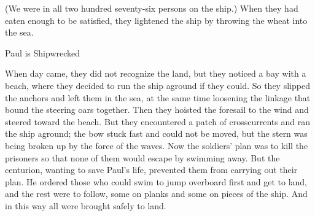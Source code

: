 {(We were
in all
two hundred seventy-six
persons
on
the ship.)
When they had eaten enough to be satisfied,
they lightened
the ship
by throwing
the wheat
into
the sea.
\par }{\SH Paul is Shipwrecked
\par }{\PP {}When
day
came,
they did not
recognize
the land,
but
they noticed
a bay
with a beach,
where
they decided
to run
the ship
aground
if
they could.
So
they slipped
the anchors
and left
them in
the sea,
at the same time
loosening
the linkage
that bound the steering oars
together. Then
they hoisted
the foresail
to the wind
and steered
toward
the beach.
But
they encountered
a patch
of crosscurrents
and
ran
the ship
aground;
the bow
stuck fast
and could not be moved,
but
the stern
was being broken up
by
the force of the waves.
Now
the soldiers’
plan
was to kill
the prisoners
so that
none
of them
would escape by swimming away.
But
the centurion,
wanting
to save
Paul’s
life, prevented
them
from carrying out their plan.
He ordered
those who could
swim
to jump overboard
first
and get
to
land,
and
the rest
were to follow, some on
planks
and
some
on
pieces of
the ship.
And
in this way
all
were
brought safely
to
land.

}
